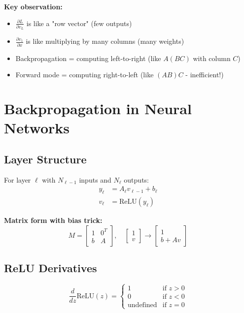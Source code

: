 \documentclass[11pt]{article}
\begin{document}
\textbf{Key observation:}
\begin{itemize}
\item $\frac{\partial L}{\partial v_L}$ is like a "row vector" (few outputs)
\item $\frac{\partial v_1}{\partial x}$ is like multiplying by many columns (many weights)
\item Backpropagation = computing left-to-right (like $A(BC)$ with column $C$)
\item Forward mode = computing right-to-left (like $(AB)C$ - inefficient!)
\end{itemize}

\section{Backpropagation in Neural Networks}

\subsection{Layer Structure}
For layer $\ell$ with $N_{\ell-1}$ inputs and $N_\ell$ outputs:
\begin{align}
y_\ell &= A_\ell v_{\ell-1} + b_\ell\\
v_\ell &= \text{ReLU}(y_\ell)
\end{align}

\textbf{Matrix form with bias trick:}
\begin{equation}
M = \begin{bmatrix} 1 & 0^T \\ b & A \end{bmatrix}, \quad \begin{bmatrix} 1 \\ v \end{bmatrix} \rightarrow \begin{bmatrix} 1 \\ b + Av \end{bmatrix}
\end{equation}

\subsection{ReLU Derivatives}
\begin{equation}
\frac{d}{dz}\text{ReLU}(z) = \begin{cases}
1 & \text{if } z > 0\\
0 & \text{if } z < 0\\
\text{undefined} & \text{if } z = 0
\end{cases}
\end{equation}
\end{document}
